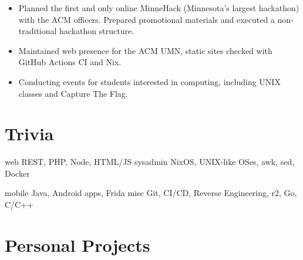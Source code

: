 \documentclass{moderncv}
\newcommand{\comment}[1]{}
\begin{document}
{
  \begin{itemize}[label=\rightarrow,noitemsep]
  \item Planned the first and only online MinneHack (Minnesota's largest hackathon) with the ACM officers. Prepared promotional materials and executed a non-traditional hackathon structure.
  \item Maintained web presence for the ACM UMN, static sites checked with GitHub Actions CI and Nix.
  \item Conducting events for students interested in computing, including UNIX classes and Capture The Flag.
  \end{itemize}
}

\comment{
\cventry{2019--2020}{Member, Controls Team}{UMN Solar Vehicle Project}{}{}
{
  \begin{itemize}[label=\rightarrow,noitemsep]
  \item Worked on design of the rearview system and integrated USB tethered logging for the telemetry system.
  \item Prototyped an editor for a YAML-based CAN packet definition schema in Rust.
  \item Participated extensively in build cycle (layups) for the Freya vehicle, which won 1st place at the Formula Sun Grand Prix.
  \end{itemize}
}}

\section{Trivia}

\cvdoubleitem
{web}
{
  REST, PHP, Node, HTML/JS
}
{sysadmin}
{
  NixOS, UNIX-like OSes, awk, sed, Docker
}

\cvdoubleitem
{mobile}
{
  Java, Android apps, Frida
}
{misc}
{
  Git, CI/CD, Reverse Engineering, r2, Go, C/C++
}

\section{Personal Projects}
\end{document}
